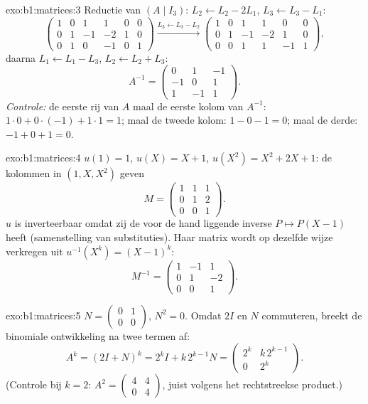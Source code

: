 \begin{solution}{exo:b1:matrices:3}
Reductie van $(A \mid I_3)$: $L_2 \leftarrow L_2 - 2L_1$, $L_3
\leftarrow L_3 - L_1$:
\[
\begin{pmatrix}
1 & 0 & 1 & 1 & 0 & 0\\
0 & 1 & -1 & -2 & 1 & 0\\
0 & 1 & 0 & -1 & 0 & 1
\end{pmatrix}
\xrightarrow{L_3 \leftarrow L_3 - L_2}
\begin{pmatrix}
1 & 0 & 1 & 1 & 0 & 0\\
0 & 1 & -1 & -2 & 1 & 0\\
0 & 0 & 1 & 1 & -1 & 1
\end{pmatrix},
\]
daarna $L_1 \leftarrow L_1 - L_3$, $L_2 \leftarrow L_2 + L_3$:
\[
A^{-1} = \begin{pmatrix}
0 & 1 & -1\\
-1 & 0 & 1\\
1 & -1 & 1
\end{pmatrix}.
\]
\emph{Controle:} de eerste rij van $A$ maal de eerste kolom van
$A^{-1}$: $1 \cdot 0 + 0\cdot(-1) + 1\cdot 1 = 1$; maal de tweede
kolom: $1 - 0 - 1 = 0$; maal de derde: $-1 + 0 + 1 = 0$.
\end{solution}

\begin{solution}{exo:b1:matrices:4}
$u(1) = 1$, $u(X) = X + 1$, $u(X^2) = X^2 + 2X + 1$: de kolommen
 in $(1, X, X^2)$ geven
\[
M = \begin{pmatrix}
1 & 1 & 1\\
0 & 1 & 2\\
0 & 0 & 1
\end{pmatrix}.
\]
$u$ is inverteerbaar omdat zij de voor de hand liggende inverse $P
\mapsto P(X - 1)$ heeft (samenstelling van substituties). Haar
matrix wordt op dezelfde wijze verkregen uit $u^{-1}(X^k) =
(X-1)^k$:
\[
M^{-1} = \begin{pmatrix}
1 & -1 & 1\\
0 & 1 & -2\\
0 & 0 & 1
\end{pmatrix}.
\]
\end{solution}

\begin{solution}{exo:b1:matrices:5}
$N = \begin{pmatrix} 0 & 1\\ 0 & 0\end{pmatrix}$, $N^2 = 0$. Omdat
$2I$ en $N$ commuteren, breekt de binomiale ontwikkeling na twee
termen af:
\[
A^k = (2I + N)^k = 2^k I + k\,2^{k-1} N
= \begin{pmatrix} 2^k & k\,2^{k-1}\\ 0 & 2^k\end{pmatrix}.
\]
(Controle bij $k = 2$: $A^2 = \begin{pmatrix}4 & 4\\ 0 &
4\end{pmatrix}$, juist volgens het rechtstreekse product.)
\end{solution}

